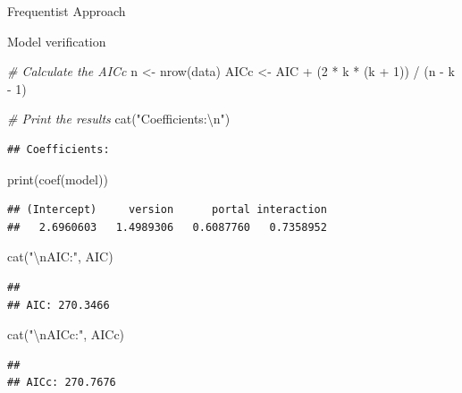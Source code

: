 \documentclass[
  ignorenonframetext,
]{beamer}
\newenvironment{Shaded}{\begin{snugshade}}{\end{snugshade}}
\newcommand{\CommentTok}[1]{\textcolor[rgb]{0.56,0.35,0.01}{\textit{#1}}}
\newcommand{\DecValTok}[1]{\textcolor[rgb]{0.00,0.00,0.81}{#1}}
\newcommand{\FunctionTok}[1]{\textcolor[rgb]{0.00,0.00,0.00}{#1}}
\newcommand{\NormalTok}[1]{#1}
\newcommand{\OtherTok}[1]{\textcolor[rgb]{0.56,0.35,0.01}{#1}}
\newcommand{\SpecialCharTok}[1]{\textcolor[rgb]{0.00,0.00,0.00}{#1}}
\newcommand{\StringTok}[1]{\textcolor[rgb]{0.31,0.60,0.02}{#1}}
\begin{document}
\begin{frame}[fragile]{Frequentist Approach}
\begin{block}{Model verification}
\begin{Shaded}
\begin{Highlighting}[]
\CommentTok{\# Calculate the AICc}
\NormalTok{n }\OtherTok{\textless{}{-}} \FunctionTok{nrow}\NormalTok{(data)}
\NormalTok{AICc }\OtherTok{\textless{}{-}}\NormalTok{ AIC }\SpecialCharTok{+}\NormalTok{ (}\DecValTok{2} \SpecialCharTok{*}\NormalTok{ k }\SpecialCharTok{*}\NormalTok{ (k }\SpecialCharTok{+} \DecValTok{1}\NormalTok{)) }\SpecialCharTok{/}\NormalTok{ (n }\SpecialCharTok{{-}}\NormalTok{ k }\SpecialCharTok{{-}} \DecValTok{1}\NormalTok{)}


\CommentTok{\# Print the results}
\FunctionTok{cat}\NormalTok{(}\StringTok{"Coefficients:}\SpecialCharTok{\textbackslash{}n}\StringTok{"}\NormalTok{)}
\end{Highlighting}
\end{Shaded}

\begin{verbatim}
## Coefficients:
\end{verbatim}

\begin{Shaded}
\begin{Highlighting}[]
\FunctionTok{print}\NormalTok{(}\FunctionTok{coef}\NormalTok{(model))}
\end{Highlighting}
\end{Shaded}

\begin{verbatim}
## (Intercept)     version      portal interaction 
##   2.6960603   1.4989306   0.6087760   0.7358952
\end{verbatim}

\begin{Shaded}
\begin{Highlighting}[]
\FunctionTok{cat}\NormalTok{(}\StringTok{"}\SpecialCharTok{\textbackslash{}n}\StringTok{AIC:"}\NormalTok{, AIC)}
\end{Highlighting}
\end{Shaded}

\begin{verbatim}
## 
## AIC: 270.3466
\end{verbatim}

\begin{Shaded}
\begin{Highlighting}[]
\FunctionTok{cat}\NormalTok{(}\StringTok{"}\SpecialCharTok{\textbackslash{}n}\StringTok{AICc:"}\NormalTok{, AICc)}
\end{Highlighting}
\end{Shaded}

\begin{verbatim}
## 
## AICc: 270.7676
\end{verbatim}


\end{block}
\end{frame}
\end{document}
